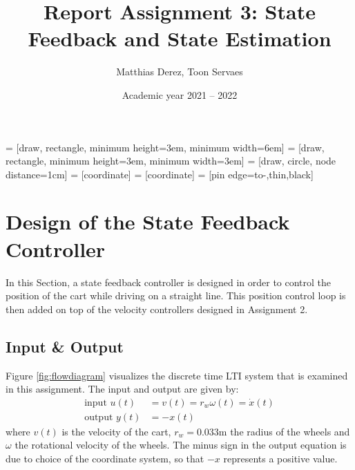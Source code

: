 \documentclass[a4paper,kul]{kulakarticle} %
\date{Academic year 2021 -- 2022}
\title{Report Assignment 3: State Feedback and State Estimation}
\author{Matthias Derez, Toon Servaes}
\begin{document}
\maketitle

\tableofcontents
\listoffigures

 = [draw, rectangle, 
minimum height=3em, minimum width=6em]
 = [draw, rectangle, 
minimum height=3em, minimum width=3em]
 = [draw, circle, node distance=1cm]
 = [coordinate]
 = [coordinate]
 = [pin edge={to-,thin,black}]



\newpage
\section{Design of the State Feedback Controller}
In this Section, a state feedback controller is designed in order to control the position of the cart while driving on a straight line. This position control loop is then added on top of the velocity controllers designed in Assignment 2. 

\subsection{Input \& Output}
Figure \ref{fig:flowdiagram} visualizes the discrete time LTI system that is examined in this assignment. The input and output are given by:
\begin{equation}
	\begin{split}
	\text{input } u(t) &= v(t) = r_w\omega(t) = \dot{x}(t) \\
	\text{output } y(t) &= -x(t)
	\end{split}
\end{equation}
where $v(t)$ is the velocity of the cart, $r_w = 0.033$m the radius of the wheels and $\omega$ the rotational velocity of the wheels. The minus sign in the output equation is due to choice of the coordinate system, so that $-x$ represents a positive value. 
\end{document}

